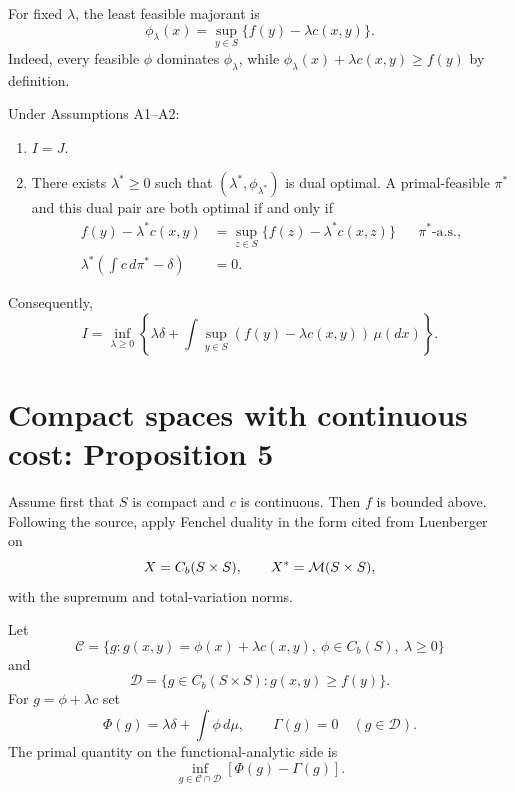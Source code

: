 For fixed $\lambda$, the least feasible majorant is
\begin{equation}
 \phi_\lambda(x)=\sup_{y\in S}\{f(y)-\lambda c(x,y)\}. \tag{7}
\end{equation}
Indeed, every feasible $\phi$ dominates $\phi_\lambda$, while
$\phi_\lambda(x)+\lambda c(x,y)\ge f(y)$ by definition.

\begin{theorem}\label{thm:BM-main}
Under Assumptions A1--A2:
\begin{enumerate}[label=(\alph*)]
\item $I=J$.
\item There exists $\lambda^*\ge0$ such that $(\lambda^*,\phi_{\lambda^*})$ is dual optimal.
A primal-feasible $\pi^*$ and this dual pair are both optimal if and only if
\begin{align}
 f(y)-\lambda^*c(x,y)
 &=\sup_{z\in S}\{f(z)-\lambda^*c(x,z)\}
 &&\pi^*\text{-a.s.}, \tag{8a}\\
 \lambda^*\left(\int c\,d\pi^*-\delta\right)&=0. \tag{8b}
\end{align}
\end{enumerate}
Consequently,
\begin{equation}
 I=\inf_{\lambda\ge0}
 \left\{\lambda\delta+
 \int\sup_{y\in S}(f(y)-\lambda c(x,y))\,\mu(dx)\right\}. \tag{9}
\end{equation}
\end{theorem}

\section{Compact spaces with continuous cost: Proposition 5}
Assume first that $S$ is compact and $c$ is continuous.  Then $f$ is bounded above.
Following the source, apply Fenchel duality in the form cited from Luenberger~\cite[Chapter~7]{Luenberger1997} on
\[
 X=C_b(S\times S),\qquad X^*=\mathcal{M}(S\times S),
\]
with the supremum and total-variation norms.

Let
\[
 \mathcal C=\{g:g(x,y)=\phi(x)+\lambda c(x,y),\
       \phi\in C_b(S),\ \lambda\ge0\}
\]
and
\[
 \mathcal D=\{g\in C_b(S\times S):g(x,y)\ge f(y)\}.
\]
For $g=\phi+\lambda c$ set
\[
 \Phi(g)=\lambda\delta+\int\phi\,d\mu,
 \qquad \Gamma(g)=0\quad(g\in\mathcal D).
\]
The primal quantity on the functional-analytic side is
\begin{equation}
 \inf_{g\in\mathcal C\cap\mathcal D}[\Phi(g)-\Gamma(g)]. \tag{26}
\end{equation}

